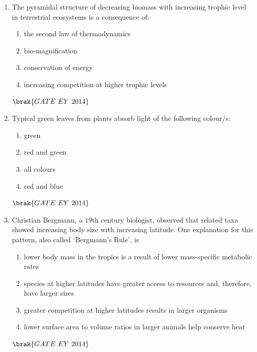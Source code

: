 \documentclass[journal]{IEEEtran}
\numberwithin{equation}{enumi}
\numberwithin{figure}{enumi}
\begin{document}
\begin{enumerate}
    \item The pyramidal structure of decreasing biomass with increasing trophic level in terrestrial ecosystems is a consequence of:
    \begin{multicols}{2}
    \begin{enumerate}
        \item the second law of thermodynamics
        \item bio-magnification\newline
        \item conservation of energy
        \item increasing competition at higher trophic levels
    \end{enumerate}
    \end{multicols}
    \hfill{$\brak{ GATE\ EY\ 2014}$}
    \bigskip
    
    \item Typical green leaves from plants absorb light of the following colour/s:
    \begin{multicols}{2}
    \begin{enumerate}
        \item green
        \item red and green
        \item all colours
        \item red and blue
    \end{enumerate}
    \end{multicols}
    \hfill{$\brak{ GATE\ EY\ 2014}$}
    \bigskip
    
    \item Christian Bergmann, a $19$th century biologist, observed that related taxa showed increasing body size with increasing latitude. One explanation for this pattern, also called `Bergmann's Rule', is
    \begin{enumerate}
        \item lower body mass in the tropics is a result of lower mass-specific metabolic rates
        \item species at higher latitudes have greater access to resources and, therefore, have larger sizes
        \item greater competition at higher latitudes results in larger organisms
        \item lower surface area to volume ratios in larger animals help conserve heat
    \end{enumerate}
    \hfill{$\brak{ GATE\ EY\ 2014}$}
    \bigskip
    

\end{enumerate}
\end{document}
